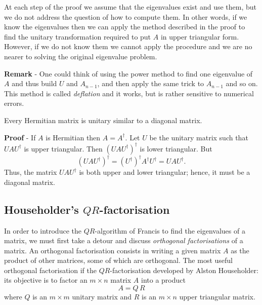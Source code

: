 \smallskip

\noindent
At each step of the proof we assume that the eigenvalues exist and use
them, but we do not address the question of how to compute them.  In
other words, if we know the eigenvalues then we can apply the method
described in the proof to find the unitary transformation required to
put $A$ in upper triangular form.  However, if we do not know them we
cannot apply the procedure and we are no nearer to solving the
original eigenvalue problem.

\noindent 
\textbf{Remark} - One could think of using the power method to find
one eigenvalue of $A$ and thus build $U$ and $A_{n-1}$, and then apply
the same trick to $A_{n-1}$ and so on.  This method is called
\textit{deflation} and it works, but is rather sensitive to numerical
errors.

\begin{corollary}
  Every Hermitian matrix is unitary similar to a diagonal matrix.
\end{corollary}

\noindent
\textbf{Proof} - If $A$ is Hermitian then $A = A^{\dagger}$.  Let $U$
be the unitary matrix such that $U A U^{\dagger}$ is upper triangular.
Then $(U A U^{\dagger})^{\dagger}$ is lower triangular.  But
%
\begin{equation*}
  (U A U^{\dagger})^{\dagger} = 
  (U^{\dagger})^{\dagger} A^{\dagger} U^{\dagger} = 
  U A U^{\dagger} .
\end{equation*}
% 
Thus, the matrix $U A U^{\dagger}$ is both upper and lower triangular;
hence, it must be a diagonal matrix.

\subsection{Householder's \texorpdfstring{$QR$}{QR}-factorisation}

In order to introduce the $QR$-algorithm of Francis to find the
eigenvalues of a matrix, we must first take a detour and discuss
\textit{orthogonal factorisations} of a matrix.  An orthogonal
factorisation consists in writing a given matrix $A$ as the product of
other matrices, some of which are orthogonal.  The most useful
orthogonal factorisation if the $QR$-factorisation developed by Alston
Householder: its objective is to factor an $m \times n$ matrix $A$
into a product
%
\begin{equation}
  A = Q \, R
  \label{eq:Ev15}
\end{equation}
%
where $Q$ is an $m \times m$ unitary matrix and $R$ is an $m \times n$
upper triangular matrix.

